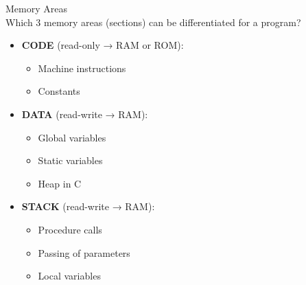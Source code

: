 \begin{example2}{Memory Areas}\\
Which 3 memory areas (sections) can be differentiated for a program?

\begin{itemize}
  \item \textbf{CODE} (read-only → RAM or ROM):
    \begin{itemize}
      \item Machine instructions
      \item Constants
    \end{itemize}
  \item \textbf{DATA} (read-write → RAM):
    \begin{itemize}
      \item Global variables
      \item Static variables
      \item Heap in C
    \end{itemize}
  \item \textbf{STACK} (read-write → RAM):
    \begin{itemize}
      \item Procedure calls
      \item Passing of parameters
      \item Local variables
    \end{itemize}
\end{itemize}
\end{example2}

